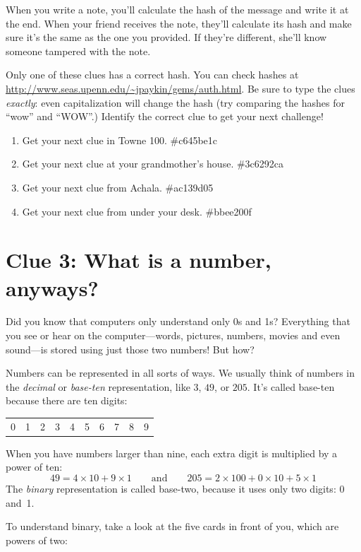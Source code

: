 \documentclass{article}
\begin{document}
When you write a note, you'll calculate the hash of the message and write it at the end. When your friend receives the note, they'll calculate its hash and make sure it's the same as the one you provided. If they're different, she'll know someone tampered with the note.

Only one of these clues has a correct hash. You can check hashes at \url{http://www.seas.upenn.edu/~jpaykin/gems/auth.html}. Be sure to type the clues \textit{exactly}: even capitalization will change the hash (try comparing the hashes for ``wow'' and ``WOW''.) Identify the correct clue to get your next challenge!

\begin{enumerate}
  \item Get your next clue in Towne 100. \#c645be1c
  \item Get your next clue at your grandmother's house. \#3c6292ca
  \item Get your next clue from Achala. \#ac139d05
  \item Get your next clue from under your desk. \#bbee200f
\end{enumerate}

\newpage

\section*{Clue 3: What is a number, anyways?}

Did you know that computers only understand only 0s and 1s? Everything that you
see or hear on the computer---words, pictures, numbers, movies and even sound---is
stored using just those two numbers! But how? 

Numbers can be represented in all sorts of ways. We usually think of numbers in
the \emph{decimal} or \emph{base-ten} representation, like $3$, $49$, or $205$.
It's called base-ten because there are ten digits:
\begin{center}\begin{tabular}{cccccccccc}
    0 & 1 & 2 & 3 & 4 & 5 & 6 & 7 & 8 & 9
\end{tabular}\end{center}
When you have numbers larger than nine, each extra digit is multiplied by a
power of ten:
\[
    49 = 4\times10 + 9\times1 \qquad\textrm{and}\qquad 
    205 = 2\times100 + 0\times10 + 5\times1
\]
The \emph{binary} representation is called base-two, because it uses only
two digits: 0 and~1. 

To understand binary, take a look at the five cards in front of you, which are
powers of two:
\end{document}

